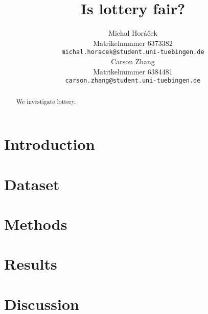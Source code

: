 \documentclass{article}
\title{Is lottery fair?}
\author{%
  Michal Horáček\\
  Matrikelnummer 6373382\\
  \texttt{michal.horacek@student.uni-tuebingen.de} \\
  \And
  Carson Zhang\\
  Matrikelnummer 6384481\\
  \texttt{carson.zhang@student.uni-tuebingen.de} \\
}
\begin{document}
\maketitle

\begin{abstract}
    We investigate lottery.
\end{abstract}

\section{Introduction}
\label{sec:introduction}


\section{Dataset}
\label{sec:dataset}


\section{Methods}
\label{sec:methods}


\section{Results}
\label{sec:results}


\section{Discussion}
\label{sec:discussion}




\end{document}
